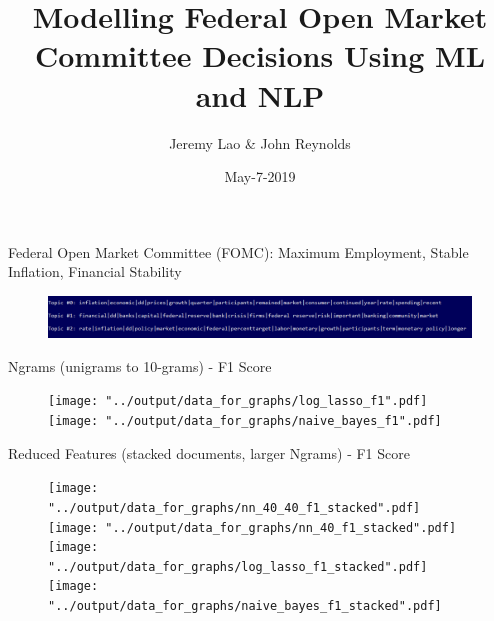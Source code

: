 \documentclass{beamer}
\title{Modelling Federal Open Market Committee Decisions Using ML and NLP}
\author{Jeremy Lao \& John Reynolds}
\institute[NYU]
{
Department of Computer Science\\
Courant Institute of Mathematical Sciences, NYU\\
  \texttt{}
}
\date{May-7-2019}
\begin{document}
\begin{frame}
\titlepage
\end{frame}



\begin{frame}
Federal Open Market Committee (FOMC): Maximum Employment, Stable Inflation, Financial Stability
\vspace{-3mm}
\begin{figure}[H]
\includegraphics[width=1\textwidth]{../output/data_for_graphs/Topic-Model-3-topics.PNG}
\end{figure}
\vspace{-5mm}

Ngrams (unigrams to 10-grams) - F1 Score
\vspace{-1mm}
\begin{figure}[H]
\begin{center}
\texttt{[image: "../output/data\_for\_graphs/log\_lasso\_f1".pdf]}
\texttt{[image: "../output/data\_for\_graphs/naive\_bayes\_f1".pdf]}
\end{center}
\end{figure}
\vspace{-5mm}

Reduced Features (stacked documents, larger Ngrams) - F1 Score
\vspace{-1mm}
\begin{figure}[H]
\texttt{[image: "../output/data\_for\_graphs/nn\_40\_40\_f1\_stacked".pdf]}
\texttt{[image: "../output/data\_for\_graphs/nn\_40\_f1\_stacked".pdf]}
\texttt{[image: "../output/data\_for\_graphs/log\_lasso\_f1\_stacked".pdf]}
\texttt{[image: "../output/data\_for\_graphs/naive\_bayes\_f1\_stacked".pdf]}
\end{figure}

\end{frame}
\end{document}
